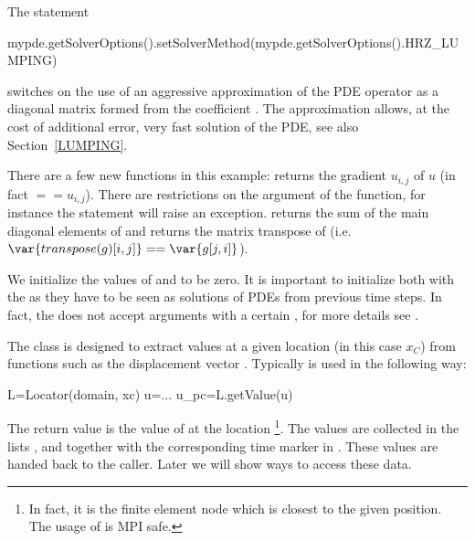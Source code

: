 The statement
\begin{python}
  mypde.getSolverOptions().setSolverMethod(mypde.getSolverOptions().HRZ_LUMPING) 
\end{python}
switches on the use of an aggressive approximation of the PDE operator as a
diagonal matrix formed from the coefficient .
The approximation allows, at the cost of additional error, very fast solution
of the PDE, see also Section~\ref{LUMPING}.

There are a few new \escript functions in this example: 
 returns the gradient $u_{i,j}$ of $u$ (in fact $==u_{i,j}$).
There are restrictions on the argument of the  function, for
instance the statement  will raise an exception.
 returns the sum of the main diagonal elements  of
 and  returns the matrix transpose of  (i.e.
$\var{transpose(g)[i,j]}==\var{g[j,i]}$). 

We initialize the values of  and  to be zero.
It is important to initialize both with the \SolutionFS as they have to be
seen as solutions of PDEs from previous time steps.
In fact, the  does not accept arguments with a certain
\FunctionSpace, for more details see . 

The  class is designed to extract values at a given location
(in this case $x_C$) from functions such as the displacement vector .
Typically  is used in the following way:
\begin{python}
  L=Locator(domain, xc)
  u=...
  u_pc=L.getValue(u)
\end{python}
The return value  is the value of  at the location
\footnote{In fact, it is the finite element node which is closest to
the given position. The usage of  is MPI safe.}.
The values are collected in the lists ,  and 
together with the corresponding time marker in .
These values are handed back to the caller. Later we will show ways to access these data.

